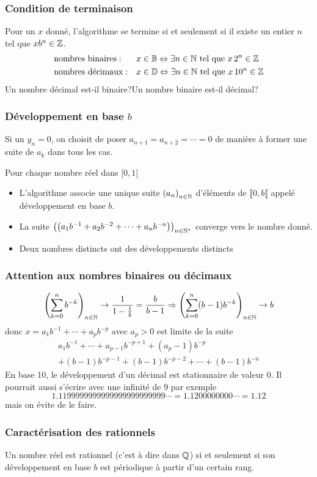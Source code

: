 \begin{frame}
  \frametitle{Condition de terminaison}
Pour un $x$ donné, l'algorithme se termine si et seulement si il existe un entier $n$ tel que $xb^n \in \mathbb{Z}$.
\begin{align*}
  &\text{nombres binaires}:& &x\in \mathbb{B} \Leftrightarrow \exists n \in\mathbb{N} \text{ tel que } x\,2^{n} \in \mathbb{Z} \\
  &\text{nombres décimaux}:& &x\in \mathbb{D} \Leftrightarrow \exists n \in\mathbb{N} \text{ tel que } x\,10^{n} \in \mathbb{Z} 
\end{align*}
Un nombre décimal est-il binaire?\newline Un nombre binaire est-il décimal?
\end{frame}

\begin{frame}
  \frametitle{Développement en base $b$}

Si un $y_n = 0$, on choisit de poser $a_{n+1} = a_{n+2} = \cdots = 0$ de manière à former une suite de $a_k$ dans tous les cas.\newline

Pour chaque nombre réel dans $[0,1[$
\begin{itemize}
  \item L'algorithme associe une unique suite $\left( a_n\right)_{n\in \mathbb{N}}$ d'éléments de $\llbracket 0, b\llbracket$ appelé développement en base $b$.
  \item La suite  $\left( \left( a_1b^{-1} + a_2b^{-2} + \cdots + a_nb^{-n}\right)\right)_{n\in \mathbb{N}^*}$ converge vers le nombre donné.
  \item Deux nombres distincts ont des développements distincts
\end{itemize}
\end{frame}

\begin{frame}
  \frametitle{Attention aux nombres binaires ou décimaux}
\begin{displaymath}
  \left( \sum_{k=0}^n b^{-k} \right)_{n\in \mathbb{N}} \rightarrow \frac{1}{1-\frac{1}{b}} = \frac{b}{b-1}
  \Rightarrow 
  \left( \sum_{k=0}^n (b-1)b^{-k} \right)_{n\in \mathbb{N}} \rightarrow  b
\end{displaymath}
donc $x = a_1b^{-1} + \cdots + a_pb^{-p}$ avec $a_p>0$ est limite de la suite
\begin{multline*}
    a_1b^{-1} + \cdots +a_{p-1}b^{-p+1} + (a_p-1)b^{-p} \\
    + (b-1)b^{-p-1}+ (b-1)b^{-p-2} + \cdots + (b-1)b^{-n}
\end{multline*}
En base 10, le développement d'un décimal est stationnaire de valeur $0$. Il pourrait aussi s'écrire avec une infinité de $9$ par exemple 
\begin{displaymath}
 1.1199999999999999999999999\cdots = 1.1200000000\cdots = 1.12
\end{displaymath}
mais on évite de le faire.
\end{frame}

\begin{frame}
  \frametitle{Caractérisation des rationnels}
\begin{prop}
  Un nombre réel est rationnel (c'est à dire dans $\mathbb{Q}$) si et seulement si son développement en base $b$ est périodique à partir d'un certain rang.
\end{prop}
\end{frame}



